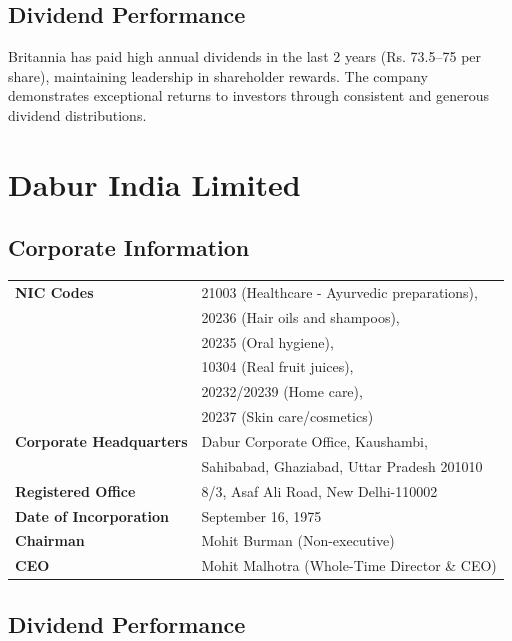 \documentclass[12pt, a4paper]{report}
\begin{document}
\subsection{Dividend Performance}

Britannia has paid high annual dividends in the last 2 years (Rs. 73.5–75 per share), maintaining leadership in shareholder rewards. The company demonstrates exceptional returns to investors through consistent and generous dividend distributions.

\section{Dabur India Limited}

\subsection{Corporate Information}

\begin{tabular}{ll}
    \textbf{NIC Codes} & 21003 (Healthcare - Ayurvedic preparations), \\
                       & 20236 (Hair oils and shampoos), \\
                       & 20235 (Oral hygiene), \\
                       & 10304 (Real fruit juices), \\
                       & 20232/20239 (Home care), \\
                       & 20237 (Skin care/cosmetics) \\
    \textbf{Corporate Headquarters} & Dabur Corporate Office, Kaushambi, \\
                                   & Sahibabad, Ghaziabad, Uttar Pradesh 201010 \\
    \textbf{Registered Office} & 8/3, Asaf Ali Road, New Delhi-110002 \\
    \textbf{Date of Incorporation} & September 16, 1975 \\
    \textbf{Chairman} & Mohit Burman (Non-executive) \\
    \textbf{CEO} & Mohit Malhotra (Whole-Time Director \& CEO) \\
\end{tabular}

\subsection{Dividend Performance}
\end{document}
